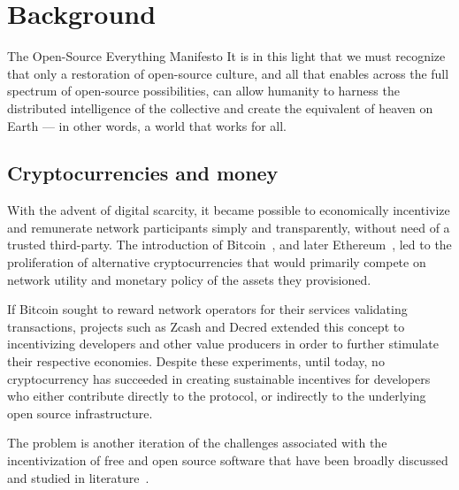 \section{Background}

\begin{epigraph}{The Open-Source Everything Manifesto}
    \noindent It is in this light that we must recognize that only a restoration of
    open-source culture, and all that enables across the full spectrum of
    open-source possibilities, can allow humanity to harness the distributed
    intelligence of the collective and create the equivalent of heaven on Earth
    --- in other words, a world that works for all.
\end{epigraph}

\subsection{Cryptocurrencies and money}

With the advent of digital scarcity, it became possible to economically
incentivize and remunerate network participants simply and transparently,
without need of a trusted third-party. The introduction of
Bitcoin~\cite{bitcoin}, and later Ethereum~\cite{ethereum}, led to the
proliferation of alternative cryptocurrencies that would primarily compete on
network utility and monetary policy of the assets they provisioned.


If Bitcoin sought to reward network operators for their services validating
transactions, projects such as Zcash and Decred extended this concept to
incentivizing developers and other value producers in order to further stimulate
their respective economies. Despite these experiments, until today, no cryptocurrency
has succeeded in creating sustainable incentives for developers who either
contribute directly to the protocol, or indirectly to the underlying open source
infrastructure.

The problem is another iteration of the challenges associated with the
incentivization of free and open source software that have been broadly
discussed and studied in literature~\cite{roads and bridges}.

